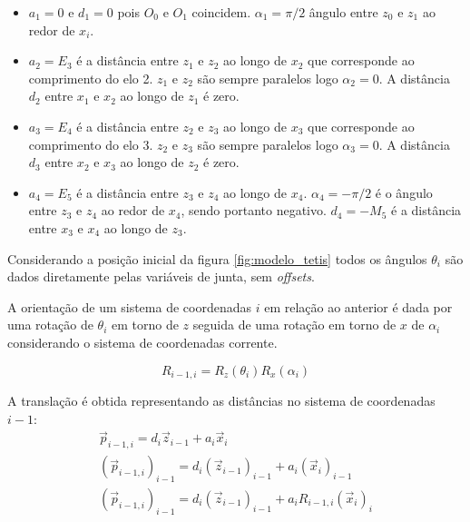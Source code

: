 \begin{itemize}
\item $a_1 = 0$  e $d_1 = 0$ pois $O_0$ e $O_1$ coincidem. $\alpha_1 = \pi/2$ ângulo entre $z_0$ e $z_1$ ao redor de $x_i$.
\item $a_2 = E_3$ é a distância entre $z_1$ e $z_2$ ao longo de $x_2$ que corresponde ao comprimento do elo 2. $z_1$ e $z_2$ são sempre paralelos logo $\alpha_2 = 0$. A distância $d_2$ entre $x_1$ e $x_2$ ao longo de $z_1$ é zero. 

\item $a_3 = E_4$ é a distância entre $z_2$ e $z_3$ ao longo de $x_3$ que corresponde ao comprimento do elo 3. $z_2$ e $z_3$ são sempre paralelos logo $\alpha_3 = 0$. A distância $d_3$ entre $x_2$ e $x_3$ ao longo de $z_2$ é zero. 

\item $a_4 = E_5$ é a distância entre $z_3$ e $z_4$ ao longo de $x_4$. $\alpha_4 = -\pi/2$ é o ângulo entre $z_3$ e $z_4$ ao redor de $x_4$, sendo portanto negativo. $d_4 = -M_5$ é a distância entre $x_3$ e $x_4$ ao longo de $z_3$. 
\end{itemize}

Considerando a posição inicial da figura \ref{fig:modelo_tetis} todos os ângulos $\theta_i$ são dados diretamente pelas variáveis de junta, sem \textit{offsets}. 

A orientação de um sistema de coordenadas $i$ em relação ao anterior é dada por uma rotação de $\theta_i$ em torno de $z$ seguida de uma rotação em torno de $x$ de $\alpha_i$ considerando o sistema de coordenadas corrente.

\begin{equation}
{R}_{i-1,i} = {R}_z(\theta_i){R}_x(\alpha_i)
\end{equation}

A translação é obtida representando as distâncias no sistema de coordenadas $i-1$:
\begin{gather}
{\vec{p}}_{i-1,i} = d_i {\vec{z}}_{i-1} + a_i {\vec{x}}_i \\
({\vec{p}}_{i-1,i})_{i-1} = d_i ({\vec{z}}_{i-1})_{i-1} + a_i ({\vec{x}}_i)_{i-1} \\
({\vec{p}}_{i-1,i})_{i-1} = d_i ({\vec{z}}_{i-1})_{i-1} + a_i {R}_{i-1,i}({\vec{x}}_i)_{i} 
\end{gather}

